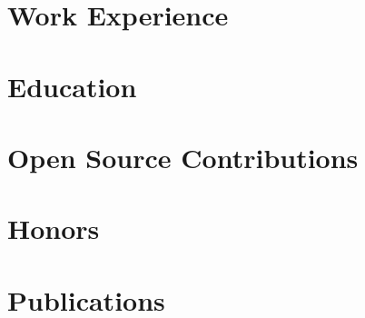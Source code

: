 \documentclass{prometheus_cv}
\begin{document}
\thispagestyle{empty}					%
\pagestyle{fancy}			 		%

\vspace*{-2cm}
{}

\section{Work Experience}


\section{Education}


\section{Open Source Contributions}



\section{Honors}


\section{Publications}

\end{document}
